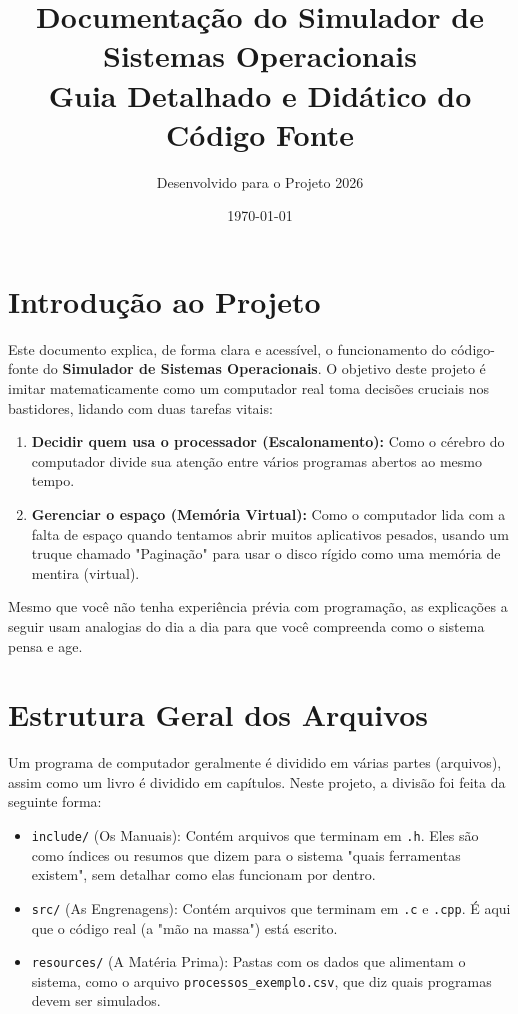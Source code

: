 \documentclass[12pt,a4paper]{article}
\title{\textbf{Documentação do Simulador de Sistemas Operacionais}\\
\large Guia Detalhado e Didático do Código Fonte}
\author{Desenvolvido para o Projeto 2026}
\date{\today}
\begin{document}
\maketitle
\tableofcontents
\newpage

\section{Introdução ao Projeto}
Este documento explica, de forma clara e acessível, o funcionamento do código-fonte do \textbf{Simulador de Sistemas Operacionais}. O objetivo deste projeto é imitar matematicamente como um computador real toma decisões cruciais nos bastidores, lidando com duas tarefas vitais:
\begin{enumerate}
    \item \textbf{Decidir quem usa o processador (Escalonamento):} Como o cérebro do computador divide sua atenção entre vários programas abertos ao mesmo tempo.
    \item \textbf{Gerenciar o espaço (Memória Virtual):} Como o computador lida com a falta de espaço quando tentamos abrir muitos aplicativos pesados, usando um truque chamado "Paginação" para usar o disco rígido como uma memória de mentira (virtual).
\end{enumerate}

Mesmo que você não tenha experiência prévia com programação, as explicações a seguir usam analogias do dia a dia para que você compreenda como o sistema pensa e age.

\section{Estrutura Geral dos Arquivos}
Um programa de computador geralmente é dividido em várias partes (arquivos), assim como um livro é dividido em capítulos. Neste projeto, a divisão foi feita da seguinte forma:
\begin{itemize}
    \item \texttt{include/} (Os Manuais): Contém arquivos que terminam em \texttt{.h}. Eles são como índices ou resumos que dizem para o sistema "quais ferramentas existem", sem detalhar como elas funcionam por dentro.
    \item \texttt{src/} (As Engrenagens): Contém arquivos que terminam em \texttt{.c} e \texttt{.cpp}. É aqui que o código real (a "mão na massa") está escrito.
    \item \texttt{resources/} (A Matéria Prima): Pastas com os dados que alimentam o sistema, como o arquivo \texttt{processos\_exemplo.csv}, que diz quais programas devem ser simulados.
\end{itemize}
\end{document}
